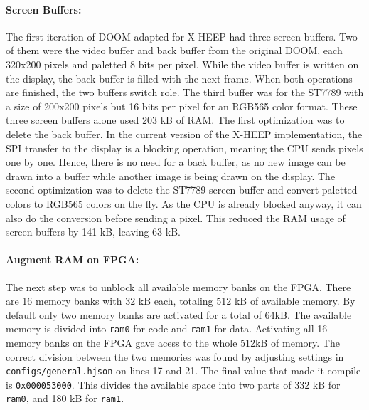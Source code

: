 \paragraph{Screen Buffers:} The first iteration of DOOM adapted for X-HEEP had three screen buffers. Two of them were the video buffer and back buffer from the original DOOM, each 320x200 pixels and paletted 8 bits per pixel. While the video buffer is written on the display, the back buffer is filled with the next frame. When both operations are finished, the two buffers switch role. The third buffer was for the ST7789 with a size of 200x200 pixels but 16 bits per pixel for an RGB565 color format. These three screen buffers alone used 203 kB of RAM. The first optimization was to delete the back buffer. In the current version of the X-HEEP implementation, the SPI transfer to the display is a blocking operation, meaning the CPU sends pixels one by one. Hence, there is no need for a back buffer, as no new image can be drawn into a buffer while another image is being drawn on the display. The second optimization was to delete the ST7789 screen buffer and convert paletted colors to RGB565 colors on the fly. As the CPU is already blocked anyway, it can also do the conversion before sending a pixel. This reduced the RAM usage of screen buffers by 141 kB, leaving 63 kB.


\paragraph{Augment RAM on FPGA:} The next step was to unblock all available memory banks on the FPGA. There are 16 memory banks with 32 kB each, totaling 512 kB of available memory. By default only two memory banks are activated for a total of 64kB. The available memory is divided into \texttt{ram0} for code and \texttt{ram1} for data. Activating all 16 memory banks on the FPGA gave acess to the whole 512kB of memory. The correct division between the two memories was found by adjusting settings in \texttt{configs/general.hjson} on lines 17 and 21. The final value that made it compile is \texttt{0x000053000}. This divides the available space into two parts of 332 kB for \texttt{ram0}, and 180 kB for \texttt{ram1}.


